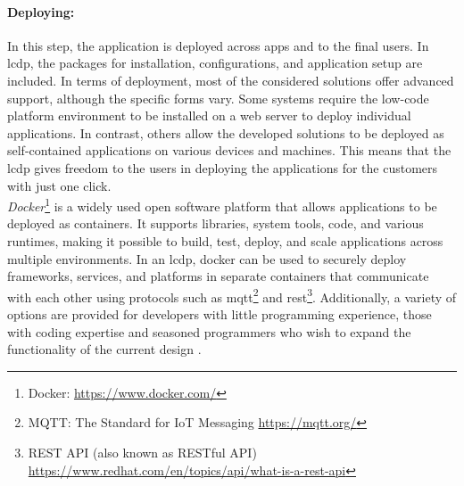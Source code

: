 \paragraph*{Deploying:}
In this step, the application is deployed across apps and to the final users.
In \ac{lcdp}, the packages for installation, configurations, and application setup are included.
In terms of deployment, most of the considered solutions offer advanced support, although the specific forms vary. 
Some systems require the low-code platform environment to be installed on a web server to deploy individual applications. 
In contrast, others allow the developed solutions to be deployed as self-contained applications on various devices and machines.
This means that the \ac{lcdp} gives freedom to the users in deploying the applications for the customers with just one click. \\
\textit{Docker}\footnote{Docker: \url{https://www.docker.com/}} is a widely used open software platform that allows applications to be deployed as containers. 
It supports libraries, system tools, code, and various runtimes, making it possible to build, test, deploy, and scale applications across multiple environments. 
In an \ac{lcdp}, docker can be used to securely deploy frameworks, services, and platforms in separate containers that communicate with each other using protocols such as \ac{mqtt}\footnote{MQTT: The Standard for IoT Messaging \url{https://mqtt.org/}} and \ac{rest}\footnote{REST API (also known as RESTful API) \url{https://www.redhat.com/en/topics/api/what-is-a-rest-api}}.
Additionally, a variety of options are provided for developers with little programming experience, those with coding expertise and seasoned programmers who wish to expand the functionality of the current design \cite{article:nocode:sahina}.

